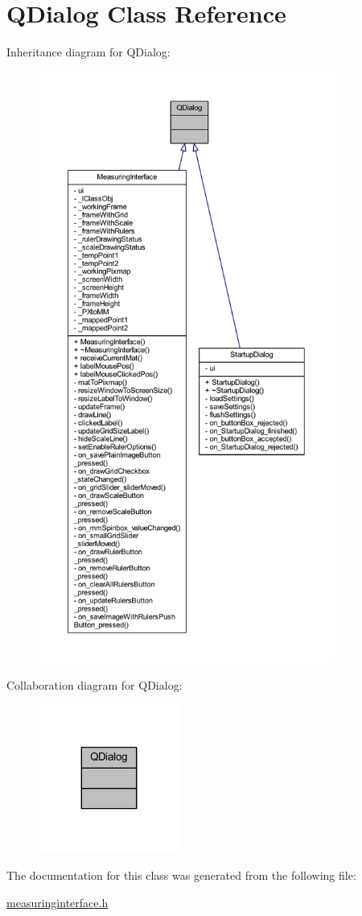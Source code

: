 \hypertarget{classQDialog}{}\section{Q\+Dialog Class Reference}
\label{classQDialog}


Inheritance diagram for Q\+Dialog\+:
\nopagebreak
\begin{figure}[H]
\begin{center}
\leavevmode
\includegraphics[height=550pt]{classQDialog__inherit__graph}
\end{center}
\end{figure}


Collaboration diagram for Q\+Dialog\+:
\nopagebreak
\begin{figure}[H]
\begin{center}
\leavevmode
\includegraphics[width=131pt]{classQDialog__coll__graph}
\end{center}
\end{figure}


The documentation for this class was generated from the following file\+:\begin{DoxyCompactItemize}
\item 
\mbox{\hyperlink{measuringinterface_8h}{measuringinterface.\+h}}\end{DoxyCompactItemize}
